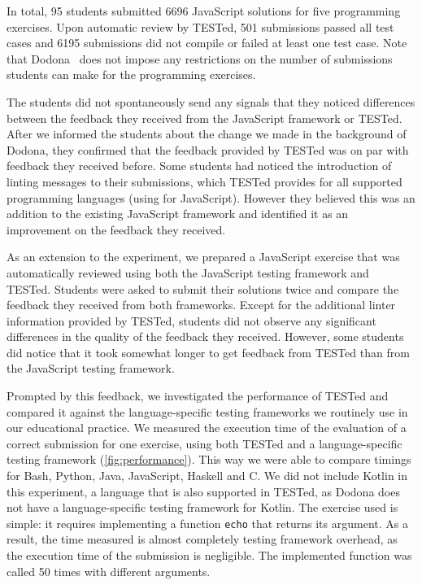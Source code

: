 \documentclass[../main]{subfiles}
\begin{document}
In total, \num{95} students submitted \num{6696} JavaScript solutions for five programming exercises.
Upon automatic review by TESTed, \num{501} submissions passed all test cases and \num{6195} submissions did not compile or failed at least one test case.
Note that Dodona~\autocite{vanpetegemDodonaLearnCode2023} does not impose any restrictions on the number of submissions students can make for the programming exercises.

The students did not spontaneously send any signals that they noticed differences between the feedback they received from the JavaScript framework or TESTed.
After we informed the students about the change we made in the background of Dodona, they confirmed that the feedback provided by TESTed was on par with feedback they received before.
Some students had noticed the introduction of linting messages to their submissions, which TESTed provides for all supported programming languages (using  for JavaScript).
However they believed this was an addition to the existing JavaScript framework and identified it as an improvement on the feedback they received.

As an extension to the experiment, we prepared a JavaScript exercise that was automatically reviewed using both the JavaScript testing framework and TESTed.
Students were asked to submit their solutions twice and compare the feedback they received from both frameworks.
Except for the additional linter information provided by TESTed, students did not observe any significant differences in the quality of the feedback they received.
However, some students did notice that it took somewhat longer to get feedback from TESTed than from the JavaScript testing framework.

Prompted by this feedback, we investigated the performance of TESTed and compared it against the language-specific testing frameworks we routinely use in our educational practice.
We measured the execution time of the evaluation of a correct submission for one exercise, using both TESTed and a language-specific testing framework (\cref{fig:performance}).
This way we were able to compare timings for Bash, Python, Java, JavaScript, Haskell and C\@.
We did not include Kotlin in this experiment, a language that is also supported in TESTed, as Dodona does not have a language-specific testing framework for Kotlin.
The exercise used is simple: it requires implementing a function \texttt{echo} that returns its argument.
As a result, the time measured is almost completely testing framework overhead, as the execution time of the submission is negligible.
The implemented function was called 50 times with different arguments.
\end{document}

